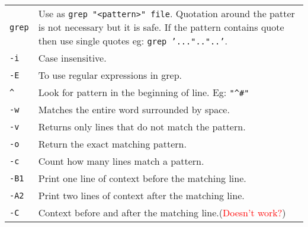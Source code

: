 
\begin{tabularx}{\linewidth}{lX}
\texttt{grep} & Use as \texttt{grep "<pattern>" file}. Quotation around the patter is not necessary but it is safe. If the pattern contains quote then use single quotes eg: \texttt{grep '...".."..'}.\\
\texttt{-i} & Case insensitive.\\
\texttt{-E} & To use regular expressions in grep.\\
\texttt{\^} & Look for pattern in the beginning of line. Eg: \texttt{"\^{}\#"}\\
\texttt{-w} & Matches the entire word surrounded by space.\\
\texttt{-v} & Returns only lines that do not match the pattern.\\
\texttt{-o} & Return the exact matching pattern.\\
\texttt{-c} & Count how many lines match a pattern.\\
\texttt{-B1} & Print one line of context before the matching line.\\
\texttt{-A2} & Print two lines of context after the matching line.\\
\texttt{-C} & Context before and after the matching line.(\textcolor{red}{Doesn't work?})\\
\hline

\end{tabularx}

